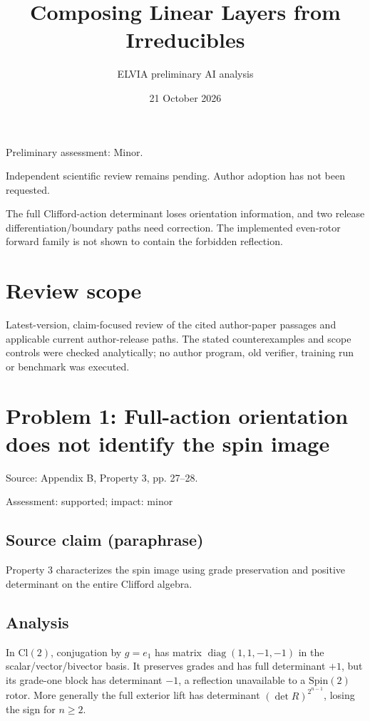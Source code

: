 \documentclass[11pt]{article}
\begin{document}
\title{Composing Linear Layers from Irreducibles}

\author{ELVIA preliminary AI analysis}\date{21 October 2026}\maketitle

Preliminary assessment: Minor.\par

Independent scientific review remains pending. Author adoption has not been requested.

The full Clifford-action determinant loses orientation information, and two release differentiation/boundary paths need correction. The implemented even-rotor forward family is not shown to contain the forbidden reflection.

\section*{Review scope}

Latest-version, claim-focused review of the cited author-paper passages and applicable current author-release paths. The stated counterexamples and scope controls were checked analytically; no author program, old verifier, training run or benchmark was executed.

\section*{Problem 1: Full-action orientation does not identify the spin image}

Source: Appendix B, Property 3, pp. 27–28.

Assessment: supported; impact: minor

\subsection*{Source claim (paraphrase)}

Property 3 characterizes the spin image using grade preservation and positive determinant on the entire Clifford algebra.

\subsection*{Analysis}

In \(\mathrm{Cl}(2)\), conjugation by \(g=e_1\) has matrix \(\operatorname{diag}(1,1,-1,-1)\) in the scalar/vector/bivector basis. It preserves grades and has full determinant \(+1\), but its grade-one block has determinant \(-1\), a reflection unavailable to a \(\mathrm{Spin}(2)\) rotor. More generally the full exterior lift has determinant \((\det R)^{2^{n-1}}\), losing the sign for \(n\geq2\).
\end{document}
